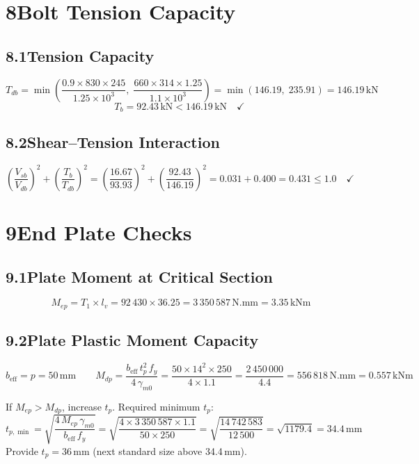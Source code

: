 \documentclass[12pt,a4paper]{article}
\newcommand{\kN}{\,\text{kN}}
\newcommand{\kNm}{\,\text{kNm}}
\newcommand{\mm}{\,\text{mm}}
\begin{document}
\section{8\quad Bolt Tension Capacity}

\subsection{8.1\quad Tension Capacity}
\[
  T_{db} = \min\!\left(
    \frac{0.9\times 830\times 245}{1.25\times 10^3},\;
    \frac{660\times 314\times 1.25}{1.1\times 10^3}
  \right)
  = \min(146.19,\;235.91)
  = \boxed{146.19\kN}
  \tag{IS 800 Cl.10.3.5}
\]
\[
  T_b = 92.43\kN < 146.19\kN \quad\checkmark\;
\]

\subsection{8.2\quad Shear--Tension Interaction}
\[
  \left(\frac{V_{sb}}{V_{db}}\right)^2 + \left(\frac{T_b}{T_{db}}\right)^2
  = \left(\frac{16.67}{93.93}\right)^2+\left(\frac{92.43}{146.19}\right)^2
  = 0.031+0.400
  = 0.431 \leq 1.0 \quad\checkmark\;
  \tag{IS 800 Cl.10.3.6}
\]

\section{9\quad End Plate Checks}

\subsection{9.1\quad Plate Moment at Critical Section}
\[
  M_{ep} = T_1\times l_v = 92\,430\times 36.25 = 3\,350\,587\,\text{N.mm}
         = \boxed{3.35\kNm}
\]

\subsection{9.2\quad Plate Plastic Moment Capacity}
\[
  b_{\text{eff}} = p = 50\mm
  \qquad
  M_{dp} = \frac{b_{\text{eff}}\,t_p^2\,f_y}{4\,\gamma_{m0}}
         = \frac{50\times 14^2\times 250}{4\times 1.1}
         = \frac{2\,450\,000}{4.4}
         = \boxed{556\,818\,\text{N.mm} = 0.557\kNm}
\]

\noindent If $M_{ep} > M_{dp}$, increase $t_p$. Required minimum $t_p$:
\[
  t_{p,\min} = \sqrt{\frac{4\,M_{ep}\,\gamma_{m0}}{b_{\text{eff}}\,f_y}}
             = \sqrt{\frac{4\times 3\,350\,587\times 1.1}{50\times 250}}
             = \sqrt{\frac{14\,742\,583}{12\,500}}
             = \sqrt{1179.4}
             = \boxed{34.4\mm}
\]
Provide $t_p = 36\mm$ (next standard size above 34.4\,mm).
\end{document}
